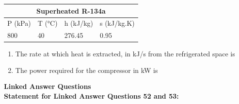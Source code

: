 \documentclass[journal,12pt,onecolumn]{IEEEtran}
\begin{document}
\begin{table}[H]
    \centering
    \begin{tabular}{|l|l|l|l|}
        \hline
        \multicolumn{4}{|c|}{\textbf{Superheated R-134a}} \\
        \hline
        P (kPa) & T (°C) & h (kJ/kg) & s (kJ/kg.K)        \\
        \hline
        800     & 40     & 276.45    & 0.95               \\
        \hline
    \end{tabular}
\end{table}

\begin{enumerate}[resume]

    \item The rate at which heat is extracted, in kJ/s from the refrigerated space is

          \begin{enumerate}
          \end{enumerate}

    \item The power required for the compressor in kW is

          \begin{enumerate}
          \end{enumerate}

\end{enumerate}

\newpage

\large\textbf{Linked Answer Questions}\\

\normalsize\textbf{Statement for Linked Answer Questions 52 and 53:}
\end{document}
